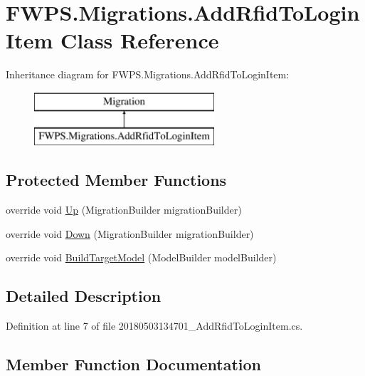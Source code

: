 \hypertarget{class_f_w_p_s_1_1_migrations_1_1_add_rfid_to_login_item}{}\section{F\+W\+P\+S.\+Migrations.\+Add\+Rfid\+To\+Login\+Item Class Reference}
\label{class_f_w_p_s_1_1_migrations_1_1_add_rfid_to_login_item}
Inheritance diagram for F\+W\+P\+S.\+Migrations.\+Add\+Rfid\+To\+Login\+Item\+:\begin{figure}[H]
\begin{center}
\leavevmode
\includegraphics[height=2.000000cm]{class_f_w_p_s_1_1_migrations_1_1_add_rfid_to_login_item}
\end{center}
\end{figure}
\subsection*{Protected Member Functions}
\begin{DoxyCompactItemize}
\item 
override void \mbox{\hyperlink{class_f_w_p_s_1_1_migrations_1_1_add_rfid_to_login_item_ac025b7cccca125b285d981ea68e096d4}{Up}} (Migration\+Builder migration\+Builder)
\item 
override void \mbox{\hyperlink{class_f_w_p_s_1_1_migrations_1_1_add_rfid_to_login_item_aef2451ba7345b34fa6e500d82bef61bd}{Down}} (Migration\+Builder migration\+Builder)
\item 
override void \mbox{\hyperlink{class_f_w_p_s_1_1_migrations_1_1_add_rfid_to_login_item_a90a057ec418f32d02fdb4f9c597adf1f}{Build\+Target\+Model}} (Model\+Builder model\+Builder)
\end{DoxyCompactItemize}


\subsection{Detailed Description}


Definition at line 7 of file 20180503134701\+\_\+\+Add\+Rfid\+To\+Login\+Item.\+cs.



\subsection{Member Function Documentation}
\mbox{\label{class_f_w_p_s_1_1_migrations_1_1_add_rfid_to_login_item_a90a057ec418f32d02fdb4f9c597adf1f}} 
